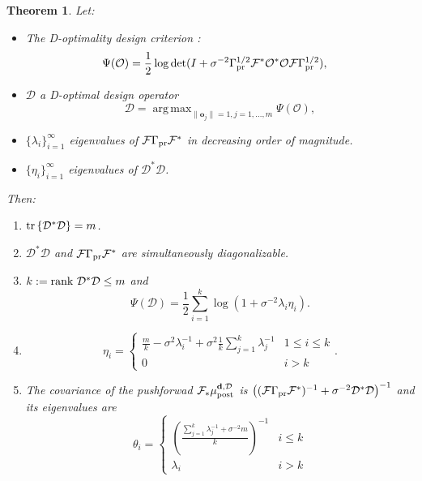 \documentclass[ba]{imsart}
\newcommand{\obs}{\mathcal{O}}
\newcommand{\fwd}{\mathcal{F}}
\newcommand{\tar}{\Psi}
\DeclareMathOperator*{\argmax}{arg\,max}
\newcommand{\data}{\mathbf{d}}
\newcommand{\meas}{\mathbf{o}}
\newcommand{\tr}[1]{\textup{tr}\left \{#1 \right \} }
\newcommand{\rank}{\textup{rank}\ }
\newcommand{\opt}{\mathcal{D}}
\newcommand{\postopt}{\mu_{\textup{post}}^{\data, \opt}}
\theoremstyle{plain}
\newtheorem{theorem}{Theorem}
\theoremstyle{definition}
\theoremstyle{remark}
\begin{document}
\begin{theorem}\label{thm:char}
  Let:
  \begin{itemize}
    \item The D-optimality design criterion
    \cite{AlexanderianGloorGhattas14}:
    \begin{align*}
      \begin{split}
        \tar(\obs) &= \frac12 \log \det ( I + \sigma^{-2} \prcov^{1/2} \fwd ^*
        \obs^* \obs \fwd \prcov^{1/2}), 
      \end{split}
    \end{align*}
  \item \(\opt\) a D-optimal design operator
    \begin{equation*}
      \opt = \argmax_{\|\meas_j\| = 1, j=1,\dots,m}\tar(\obs),
    \end{equation*}
  \item \(\{\lambda_i\}_{i=1}^\infty\) eigenvalues of
    \(\fwd\prcov\fwd^*\) in decreasing order of magnitude.
\item \(\{\eta_i\}_{i=1}^\infty\) eigenvalues of \(\opt^*\opt\).
 
  \end{itemize}

  Then:
  \begin{enumerate}
  \item  \(\tr{\opt^*\opt} = m\).
  \item \(\opt^*\opt\) and \(\fwd\prcov\fwd^*\) are simultaneously
    diagonalizable.
  \item \(k := \rank \opt^*\opt \leq m\) and
    \begin{equation*}
      \tar(\opt) = \frac12 \sum_{i=1}^{k} \log (1 + \sigma^{-2}\lambda_i\eta_i). \end{equation*}
\item
    \begin{equation*}
        \eta_i = \begin{cases}
          \frac{m}{k} - \sigma^2 \lambda_i^{-1} + \sigma^2 \frac{1}{k} \sum_{j=1}^k \lambda_j^{-1} & 1 \leq i \leq k \\
          0 & i > k 
        \end{cases}.
    \end{equation*}
  \item The covariance of the pushforwad \(\fwd_{*} \postopt\) is \(\left
    ( (\fwd \prcov \fwd^*)^{-1} + \sigma^{-2} \opt^*\opt \right
    )^{-1}\) and its eigenvalues are
    \begin{equation}\label{eq:cylinders}
      \theta_i =
      \begin{cases}
        \left(\frac{\sum_{j=1}^k \lambda_j^{-1} + \sigma^{-2}m}{k} \right )^{-1} & i \leq k \\
        \lambda_i &  i > k 
      \end{cases}
    \end{equation}
  \end{enumerate}
\end{theorem}
\end{document}
